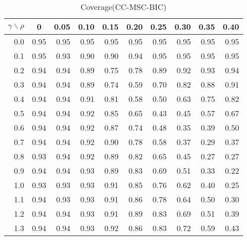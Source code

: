 \documentclass[12pt]{article}
\begin{document}
%
\begin{table}[!tbp]
\caption{Coverage(CC-MSC-BIC)}
 \begin{center}
 \begin{tabular}{r|rrrrrrrrr}\hline\hline
\multicolumn{1}{c|}{$\gamma\backslash\rho$}&\multicolumn{1}{c}{0}&\multicolumn{1}{c}{0.05}&\multicolumn{1}{c}{0.10}&\multicolumn{1}{c}{0.15}&\multicolumn{1}{c}{0.20}&\multicolumn{1}{c}{0.25}&\multicolumn{1}{c}{0.30}&\multicolumn{1}{c}{0.35}&\multicolumn{1}{c}{0.40}\tabularnewline
\hline

0.0&0.95&0.95&0.95&0.95&0.95&0.95&0.95&0.95&0.95\tabularnewline
0.1&0.95&0.93&0.90&0.90&0.94&0.95&0.95&0.95&0.95\tabularnewline
0.2&0.94&0.94&0.89&0.75&0.78&0.89&0.92&0.93&0.94\tabularnewline
0.3&0.94&0.94&0.89&0.74&0.59&0.70&0.82&0.88&0.91\tabularnewline
0.4&0.94&0.94&0.91&0.81&0.58&0.50&0.63&0.75&0.82\tabularnewline
0.5&0.94&0.94&0.92&0.85&0.65&0.43&0.45&0.57&0.67\tabularnewline
0.6&0.94&0.94&0.92&0.87&0.74&0.48&0.35&0.39&0.50\tabularnewline
0.7&0.94&0.94&0.92&0.90&0.78&0.58&0.37&0.29&0.37\tabularnewline
0.8&0.93&0.94&0.92&0.89&0.82&0.65&0.45&0.27&0.27\tabularnewline
0.9&0.94&0.94&0.93&0.89&0.83&0.69&0.51&0.33&0.22\tabularnewline
1.0&0.93&0.93&0.93&0.91&0.85&0.76&0.62&0.40&0.25\tabularnewline
1.1&0.94&0.93&0.93&0.91&0.86&0.78&0.64&0.50&0.30\tabularnewline
1.2&0.94&0.94&0.93&0.91&0.89&0.83&0.69&0.51&0.39\tabularnewline
1.3&0.94&0.94&0.93&0.92&0.86&0.83&0.72&0.59&0.43\tabularnewline
\hline
\end{tabular}

\end{center}

\end{table}
\end{document}
